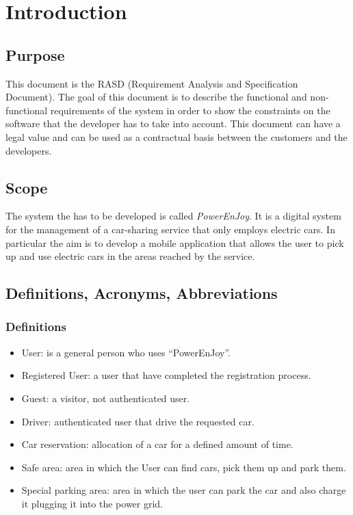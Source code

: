 
\section{Introduction}

\subsection{Purpose}
This document is the RASD (Requirement Analysis and Specification Document). The goal of this document is to describe the functional and non-functional requirements of the system in order to show the constraints on the software that the developer has to take into account. This document can have a legal value and can be used as a contractual basis between the customers and the developers.

\subsection{Scope}
The system the has to be developed is called \emph{PowerEnJoy}. It is a digital system for the management of a car-sharing service that only employs electric cars. In particular the aim is to develop a mobile application that allows the user to pick up and use electric cars in the areas reached by the service. 

\subsection{Definitions, Acronyms, Abbreviations}


\subsubsection{Definitions}
\begin{itemize}
	\item User: is a general person who uses ``PowerEnJoy''.
	\item Registered User: a user that have completed the registration process.
	\item Guest: a visitor, not authenticated user.
	\item Driver: authenticated user that drive the requested car.
	\item Car reservation: allocation of a car for a defined amount of time.
	\item Safe area: area in which the User can find cars, pick them up and park them.
	\item Special parking area: area in which the user can park the car and also charge it plugging it into the power grid. 

	
\end{itemize}

